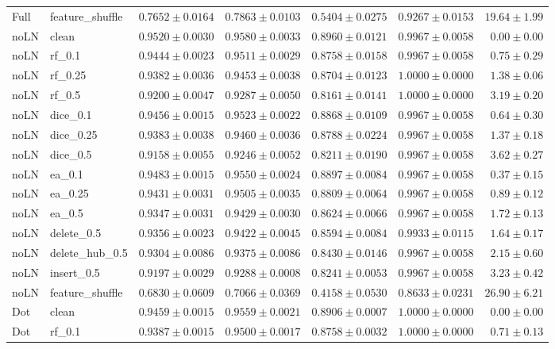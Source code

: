 \documentclass[UTF8,a4paper,11pt,fontset=fandol]{ctexart}
\begin{document}
{\begin{longtable}{llrrrrr}
Full & feature\_shuffle & $0.7652\pm0.0164$ & $0.7863\pm0.0103$ & $0.5404\pm0.0275$ & $0.9267\pm0.0153$ & $19.64\pm1.99$ \\
noLN & clean & $0.9520\pm0.0030$ & $0.9580\pm0.0033$ & $0.8960\pm0.0121$ & $0.9967\pm0.0058$ & $0.00\pm0.00$ \\
noLN & rf\_0.1 & $0.9444\pm0.0023$ & $0.9511\pm0.0029$ & $0.8758\pm0.0158$ & $0.9967\pm0.0058$ & $0.75\pm0.29$ \\
noLN & rf\_0.25 & $0.9382\pm0.0036$ & $0.9453\pm0.0038$ & $0.8704\pm0.0123$ & $1.0000\pm0.0000$ & $1.38\pm0.06$ \\
noLN & rf\_0.5 & $0.9200\pm0.0047$ & $0.9287\pm0.0050$ & $0.8161\pm0.0141$ & $1.0000\pm0.0000$ & $3.19\pm0.20$ \\
noLN & dice\_0.1 & $0.9456\pm0.0015$ & $0.9523\pm0.0022$ & $0.8868\pm0.0109$ & $0.9967\pm0.0058$ & $0.64\pm0.30$ \\
noLN & dice\_0.25 & $0.9383\pm0.0038$ & $0.9460\pm0.0036$ & $0.8788\pm0.0224$ & $0.9967\pm0.0058$ & $1.37\pm0.18$ \\
noLN & dice\_0.5 & $0.9158\pm0.0055$ & $0.9246\pm0.0052$ & $0.8211\pm0.0190$ & $0.9967\pm0.0058$ & $3.62\pm0.27$ \\
noLN & ea\_0.1 & $0.9483\pm0.0015$ & $0.9550\pm0.0024$ & $0.8897\pm0.0084$ & $0.9967\pm0.0058$ & $0.37\pm0.15$ \\
noLN & ea\_0.25 & $0.9431\pm0.0031$ & $0.9505\pm0.0035$ & $0.8809\pm0.0064$ & $0.9967\pm0.0058$ & $0.89\pm0.12$ \\
noLN & ea\_0.5 & $0.9347\pm0.0031$ & $0.9429\pm0.0030$ & $0.8624\pm0.0066$ & $0.9967\pm0.0058$ & $1.72\pm0.13$ \\
noLN & delete\_0.5 & $0.9356\pm0.0023$ & $0.9422\pm0.0045$ & $0.8594\pm0.0084$ & $0.9933\pm0.0115$ & $1.64\pm0.17$ \\
noLN & delete\_hub\_0.5 & $0.9304\pm0.0086$ & $0.9375\pm0.0086$ & $0.8430\pm0.0146$ & $0.9967\pm0.0058$ & $2.15\pm0.60$ \\
noLN & insert\_0.5 & $0.9197\pm0.0029$ & $0.9288\pm0.0008$ & $0.8241\pm0.0053$ & $0.9967\pm0.0058$ & $3.23\pm0.42$ \\
noLN & feature\_shuffle & $0.6830\pm0.0609$ & $0.7066\pm0.0369$ & $0.4158\pm0.0530$ & $0.8633\pm0.0231$ & $26.90\pm6.21$ \\
Dot & clean & $0.9459\pm0.0015$ & $0.9559\pm0.0021$ & $0.8906\pm0.0007$ & $1.0000\pm0.0000$ & $0.00\pm0.00$ \\
Dot & rf\_0.1 & $0.9387\pm0.0015$ & $0.9500\pm0.0017$ & $0.8758\pm0.0032$ & $1.0000\pm0.0000$ & $0.71\pm0.13$ \\

\end{longtable}}
\end{document}
